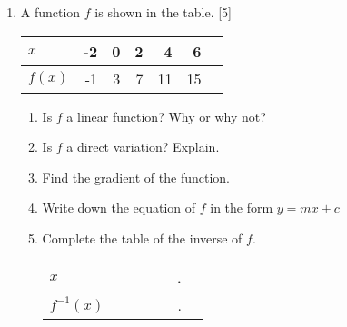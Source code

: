 \documentclass[12pt, twoside]{article}
\begin{document}
\begin{enumerate}
  \newpage
  \item A function $f$ is shown in the table. \hfill [5]
  \begin{center}
    \begin{tabular}{|l|r|r|r|r|r|r|}
      \hline
      $x$ & -2 & 0 & 2 & 4 & 6\\ 
      \hline 
      $f(x)$ & -1 & 3 & 7 & 11 & 15\\ 
      \hline 
    \end{tabular}
  \end{center}
  \begin{enumerate}[itemsep=2.5cm]
    \item Is $f$ a linear function? Why or why not?
    \item Is $f$ a direct variation? Explain.
    \item Find the gradient of the function. \vspace{1cm}
    \item Write down the equation of $f$ in the form $y=mx+c$
    \item Complete the table of the inverse of $f$.
      \begin{center}
        \begin{tabular}{|l|r|r|r|r|r|r|}
          \hline
          $x$ & \hspace{1cm} & \hspace{1cm} & \hspace{1cm} & \hspace{1cm} & \hspace{1cm}.\\[1cm] 
          \hline 
          $f^{-1}(x)$ & \hspace{1cm} & \hspace{1cm} & \hspace{1cm} & \hspace{1cm} & \hspace{1cm}.\\[1cm] 
          \hline 
        \end{tabular}
      \end{center}
  \end{enumerate}

\newpage


\end{enumerate}
\end{document}
